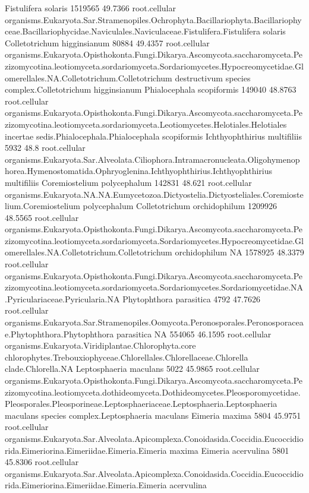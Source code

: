 \documentclass{article}
\begin{document}
\begin{Schunk}
\begin{Soutput}
 Fistulifera solaris 		 1519565 49.7366 	 root.cellular organisms.Eukaryota.Sar.Stramenopiles.Ochrophyta.Bacillariophyta.Bacillariophyceae.Bacillariophycidae.Naviculales.Naviculaceae.Fistulifera.Fistulifera solaris
 Colletotrichum higginsianum 		 80884 49.4357 	 root.cellular organisms.Eukaryota.Opisthokonta.Fungi.Dikarya.Ascomycota.saccharomyceta.Pezizomycotina.leotiomyceta.sordariomyceta.Sordariomycetes.Hypocreomycetidae.Glomerellales.NA.Colletotrichum.Colletotrichum destructivum species complex.Colletotrichum higginsianum
 Phialocephala scopiformis 		 149040 48.8763 	 root.cellular organisms.Eukaryota.Opisthokonta.Fungi.Dikarya.Ascomycota.saccharomyceta.Pezizomycotina.leotiomyceta.sordariomyceta.Leotiomycetes.Helotiales.Helotiales incertae sedis.Phialocephala.Phialocephala scopiformis
 Ichthyophthirius multifiliis 		 5932 48.8 	 root.cellular organisms.Eukaryota.Sar.Alveolata.Ciliophora.Intramacronucleata.Oligohymenophorea.Hymenostomatida.Ophryoglenina.Ichthyophthirius.Ichthyophthirius multifiliis
 Coremiostelium polycephalum 		 142831 48.621 	 root.cellular organisms.Eukaryota.NA.NA.Eumycetozoa.Dictyostelia.Dictyosteliales.Coremiostelium.Coremiostelium polycephalum
 Colletotrichum orchidophilum 		 1209926 48.5565 	 root.cellular organisms.Eukaryota.Opisthokonta.Fungi.Dikarya.Ascomycota.saccharomyceta.Pezizomycotina.leotiomyceta.sordariomyceta.Sordariomycetes.Hypocreomycetidae.Glomerellales.NA.Colletotrichum.Colletotrichum orchidophilum
 NA 		 1578925 48.3379 	 root.cellular organisms.Eukaryota.Opisthokonta.Fungi.Dikarya.Ascomycota.saccharomyceta.Pezizomycotina.leotiomyceta.sordariomyceta.Sordariomycetes.Sordariomycetidae.NA.Pyriculariaceae.Pyricularia.NA
 Phytophthora parasitica 		 4792 47.7626 	 root.cellular organisms.Eukaryota.Sar.Stramenopiles.Oomycota.Peronosporales.Peronosporaceae.Phytophthora.Phytophthora parasitica
 NA 		 554065 46.1595 	 root.cellular organisms.Eukaryota.Viridiplantae.Chlorophyta.core chlorophytes.Trebouxiophyceae.Chlorellales.Chlorellaceae.Chlorella clade.Chlorella.NA
 Leptosphaeria maculans 		 5022 45.9865 	 root.cellular organisms.Eukaryota.Opisthokonta.Fungi.Dikarya.Ascomycota.saccharomyceta.Pezizomycotina.leotiomyceta.dothideomyceta.Dothideomycetes.Pleosporomycetidae.Pleosporales.Pleosporineae.Leptosphaeriaceae.Leptosphaeria.Leptosphaeria maculans species complex.Leptosphaeria maculans
 Eimeria maxima 		 5804 45.9751 	 root.cellular organisms.Eukaryota.Sar.Alveolata.Apicomplexa.Conoidasida.Coccidia.Eucoccidiorida.Eimeriorina.Eimeriidae.Eimeria.Eimeria maxima
 Eimeria acervulina 		 5801 45.8306 	 root.cellular organisms.Eukaryota.Sar.Alveolata.Apicomplexa.Conoidasida.Coccidia.Eucoccidiorida.Eimeriorina.Eimeriidae.Eimeria.Eimeria acervulina

\end{Soutput}
\end{Schunk}
\end{document}
